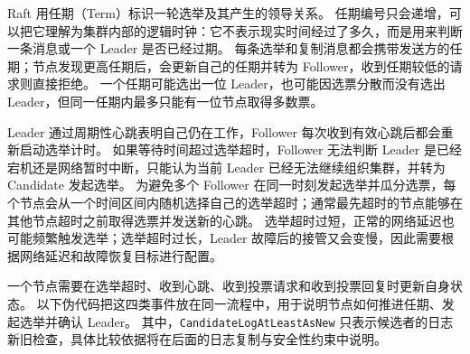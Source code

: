 Raft 用任期（Term）标识一轮选举及其产生的领导关系。
任期编号只会递增，可以把它理解为集群内部的逻辑时钟：它不表示现实时间经过了多久，而是用来判断一条消息或一个 Leader 是否已经过期。
每条选举和复制消息都会携带发送方的任期；节点发现更高任期后，会更新自己的任期并转为 Follower，收到任期较低的请求则直接拒绝。
一个任期可能选出一位 Leader，也可能因选票分散而没有选出 Leader，但同一任期内最多只能有一位节点取得多数票。

Leader 通过周期性心跳表明自己仍在工作，Follower 每次收到有效心跳后都会重新启动选举计时。
如果等待时间超过选举超时，Follower 无法判断 Leader 是已经宕机还是网络暂时中断，只能认为当前 Leader 已经无法继续组织集群，并转为 Candidate 发起选举。
为避免多个 Follower 在同一时刻发起选举并瓜分选票，每个节点会从一个时间区间内随机选择自己的选举超时；通常最先超时的节点能够在其他节点超时之前取得选票并发送新的心跳。
选举超时过短，正常的网络延迟也可能频繁触发选举；选举超时过长，Leader 故障后的接管又会变慢，因此需要根据网络延迟和故障恢复目标进行配置。

一个节点需要在选举超时、收到心跳、收到投票请求和收到投票回复时更新自身状态。
以下伪代码把这四类事件放在同一流程中，用于说明节点如何推进任期、发起选举并确认 Leader。
其中，\texttt{CandidateLogAtLeastAsNew} 只表示候选者的日志新旧检查，具体比较依据将在后面的日志复制与安全性约束中说明。

